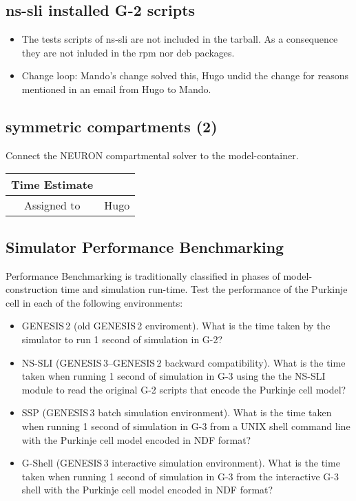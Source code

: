 \documentclass[12pt]{article}
\begin{document}
\subsection{ns-sli installed G-2 scripts}

\begin{itemize}
\item The tests scripts of ns-sli are not included in the tarball.  As
  a consequence they are not inluded in the rpm nor deb packages.
\item Change loop: Mando's change solved this, Hugo undid the change
  for reasons mentioned in an email from Hugo to Mando.
\end{itemize}


\subsection{symmetric compartments (2)}

Connect the NEURON compartmental solver to the model-container.

\begin{center}
  \vspace{5mm}
  \centering
  \begin{tabular}{|c|c|}
    \hline
    Time Estimate
    & \\
    \hline
    Assigned to
    & Hugo \\
    \hline
  \end{tabular}
\end{center}


\subsection{Simulator Performance Benchmarking}

Performance Benchmarking is traditionally classified in phases of
model-construction time and simulation run-time.  Test the performance
of the Purkinje cell in each of the following environments:

\begin{itemize}
\item GENESIS\,2 (old GENESIS\,2 enviroment).  What is the time taken
  by the simulator to run 1 second of simulation in G-2?
\item NS-SLI (GENESIS\,3--GENESIS\,2 backward compatibility).  What is
  the time taken when running 1 second of simulation in G-3 using the
  the NS-SLI module to read the original G-2 scripts that encode the
  Purkinje cell model?
\item SSP (GENESIS\,3 batch simulation environment).  What is the time
  taken when running 1 second of simulation in G-3 from a UNIX shell
  command line with the Purkinje cell model encoded in NDF format?
\item G-Shell (GENESIS\,3 interactive simulation environment).  What
  is the time taken when running 1 second of simulation in G-3 from
  the interactive G-3 shell with the Purkinje cell model encoded in
  NDF format?
\end{itemize}
\end{document}
